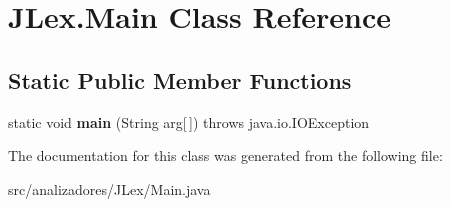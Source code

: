 \hypertarget{class_j_lex_1_1_main}{}\section{J\+Lex.\+Main Class Reference}
\label{class_j_lex_1_1_main}
\subsection*{Static Public Member Functions}
\begin{DoxyCompactItemize}
\item 
\mbox{\label{class_j_lex_1_1_main_ad93dc43626ab1d1450cc9df0db2f12c9}} 
static void {\bfseries main} (String arg\mbox{[}$\,$\mbox{]})  throws java.\+io.\+I\+O\+Exception       
\end{DoxyCompactItemize}


The documentation for this class was generated from the following file\+:\begin{DoxyCompactItemize}
\item 
src/analizadores/\+J\+Lex/Main.\+java\end{DoxyCompactItemize}
